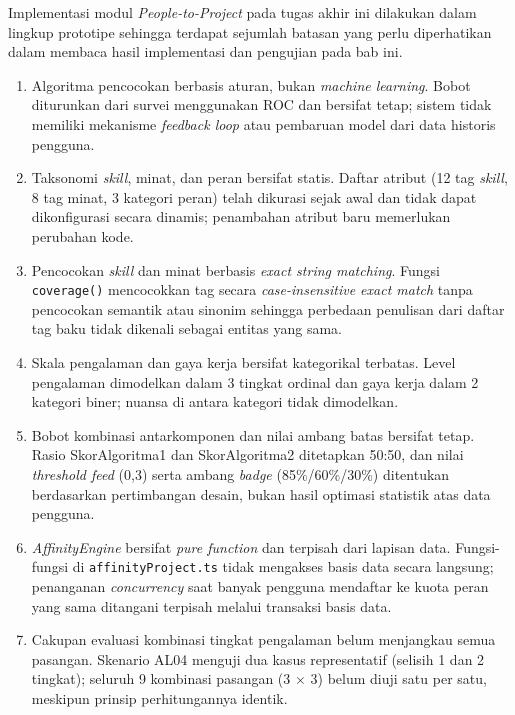 Implementasi modul \emph{People-to-Project} pada tugas akhir ini dilakukan dalam lingkup prototipe sehingga terdapat sejumlah batasan yang perlu diperhatikan dalam membaca hasil implementasi dan pengujian pada bab ini.

\begin{enumerate}

  \item Algoritma pencocokan berbasis aturan, bukan \emph{machine learning}. Bobot diturunkan dari survei menggunakan ROC dan bersifat tetap; sistem tidak memiliki mekanisme \emph{feedback loop} atau pembaruan model dari data historis pengguna.

  \item Taksonomi \emph{skill}, minat, dan peran bersifat statis. Daftar atribut (12 tag \emph{skill}, 8 tag minat, 3 kategori peran) telah dikurasi sejak awal dan tidak dapat dikonfigurasi secara dinamis; penambahan atribut baru memerlukan perubahan kode.

  \item Pencocokan \emph{skill} dan minat berbasis \emph{exact string matching}. Fungsi \texttt{coverage()} mencocokkan tag secara \emph{case-insensitive exact match} tanpa pencocokan semantik atau sinonim sehingga perbedaan penulisan dari daftar tag baku tidak dikenali sebagai entitas yang sama.

  \item Skala pengalaman dan gaya kerja bersifat kategorikal terbatas. Level pengalaman dimodelkan dalam 3 tingkat ordinal dan gaya kerja dalam 2 kategori biner; nuansa di antara kategori tidak dimodelkan.

  \item Bobot kombinasi antarkomponen dan nilai ambang batas bersifat tetap. Rasio SkorAlgoritma1 dan SkorAlgoritma2 ditetapkan 50:50, dan nilai \emph{threshold feed} (0,3) serta ambang \emph{badge} (85\%/60\%/30\%) ditentukan berdasarkan pertimbangan desain, bukan hasil optimasi statistik atas data pengguna.

  \item \emph{AffinityEngine} bersifat \emph{pure function} dan terpisah dari lapisan data. Fungsi-fungsi di \texttt{affinityProject.ts} tidak mengakses basis data secara langsung; penanganan \emph{concurrency} saat banyak pengguna mendaftar ke kuota peran yang sama ditangani terpisah melalui transaksi basis data.

  \item Cakupan evaluasi kombinasi tingkat pengalaman belum menjangkau semua pasangan. Skenario AL04 menguji dua kasus representatif (selisih 1 dan 2 tingkat); seluruh 9 kombinasi pasangan (3 $\times$ 3) belum diuji satu per satu, meskipun prinsip perhitungannya identik.


\end{enumerate}
